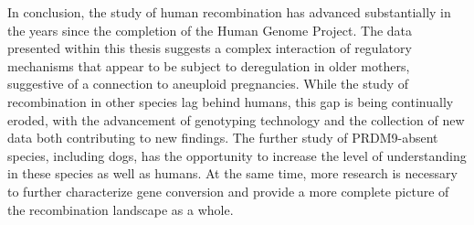 


In conclusion, the study of human recombination has advanced substantially in the years since the completion of the Human Genome Project.
The data presented within this thesis suggests a complex interaction of regulatory mechanisms that appear to be subject to deregulation in older mothers, suggestive of a connection to aneuploid pregnancies.
While the study of recombination in other species lag behind humans, this gap is being continually eroded, with the advancement of genotyping technology and the collection of new data both contributing to new findings.
The further study of PRDM9-absent species, including dogs, has the opportunity to increase the level of understanding in these species as well as humans. %
At the same time, more research is necessary to further characterize gene conversion and provide a more complete picture of the recombination landscape as a whole.



\clearpage
\renewcommand{\bibname}{References}

\begingroup
    \setlength{\bibsep}{10pt}
    \linespread{1}\selectfont
    
\endgroup

